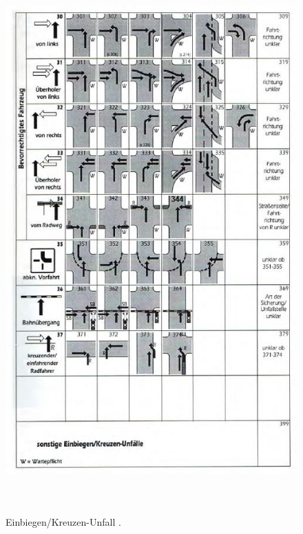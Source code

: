\begin{savenotes}
	\begin{figure}[H]
		\centering
		\includegraphics[width=13cm,height=21cm]{figures/FT3}
		\caption[Einbiegen/Kreuzen-Unfall nach GDV]{Einbiegen/Kreuzen-Unfall \parencite[S. 13]{GesamtverbandderDeutschenVersicherungswirtschafte.V..2016}. }\label{fig:FT3}
	\end{figure}
\end{savenotes}

